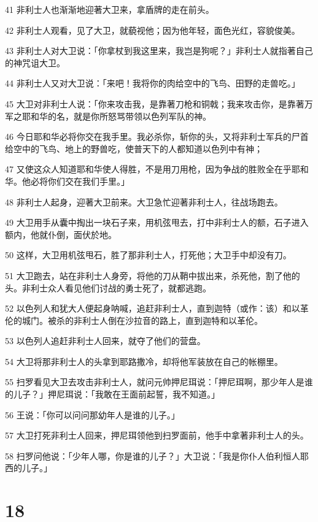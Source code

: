 \par 41 非利士人也渐渐地迎著大卫来，拿盾牌的走在前头。
\par 42 非利士人观看，见了大卫，就藐视他；因为他年轻，面色光红，容貌俊美。
\par 43 非利士人对大卫说：「你拿杖到我这里来，我岂是狗呢？」非利士人就指著自己的神咒诅大卫。
\par 44 非利士人又对大卫说：「来吧！我将你的肉给空中的飞鸟、田野的走兽吃。」
\par 45 大卫对非利士人说：「你来攻击我，是靠著刀枪和铜戟；我来攻击你，是靠著万军之耶和华的名，就是你所怒骂带领以色列军队的神。
\par 46 今日耶和华必将你交在我手里。我必杀你，斩你的头，又将非利士军兵的尸首给空中的飞鸟、地上的野兽吃，使普天下的人都知道以色列中有神；
\par 47 又使这众人知道耶和华使人得胜，不是用刀用枪，因为争战的胜败全在乎耶和华。他必将你们交在我们手里。」
\par 48 非利士人起身，迎著大卫前来。大卫急忙迎著非利士人，往战场跑去。
\par 49 大卫用手从囊中掏出一块石子来，用机弦甩去，打中非利士人的额，石子进入额内，他就仆倒，面伏於地。
\par 50 这样，大卫用机弦甩石，胜了那非利士人，打死他；大卫手中却没有刀。
\par 51 大卫跑去，站在非利士人身旁，将他的刀从鞘中拔出来，杀死他，割了他的头。非利士众人看见他们讨战的勇士死了，就都逃跑。
\par 52 以色列人和犹大人便起身呐喊，追赶非利士人，直到迦特（或作：该）和以革伦的城门。被杀的非利士人倒在沙拉音的路上，直到迦特和以革伦。
\par 53 以色列人追赶非利士人回来，就夺了他们的营盘。
\par 54 大卫将那非利士人的头拿到耶路撒冷，却将他军装放在自己的帐棚里。
\par 55 扫罗看见大卫去攻击非利士人，就问元帅押尼珥说：「押尼珥啊，那少年人是谁的儿子？」押尼珥说：「我敢在王面前起誓，我不知道。」
\par 56 王说：「你可以问问那幼年人是谁的儿子。」
\par 57 大卫打死非利士人回来，押尼珥领他到扫罗面前，他手中拿著非利士人的头。
\par 58 扫罗问他说：「少年人哪，你是谁的儿子？」大卫说：「我是你仆人伯利恒人耶西的儿子。」

\chapter{18}

